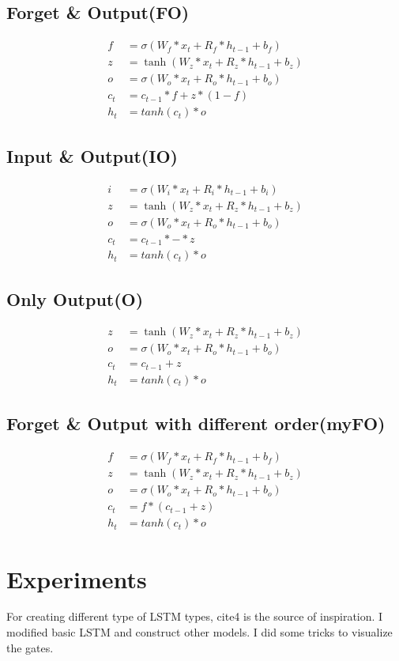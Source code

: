 \documentclass[12pt, letterpaper]{article}
\begin{document}
\subsection{Forget \& Output(FO)}
\begin{align*}
	f &= \sigma(W_f * x_{t} + R_f * h_{t-1} + b_f) \\
	z &= \tanh(W_z * x_{t} + R_z * h_{t-1} + b_z) \\ 
	o &= \sigma(W_o * x_{t} + R_o * h_{t-1} + b_o) \\
	c_t &= c_{t-1} * f + z * (1-f) \\
	h_t &= tanh(c_t) * o
\end{align*}
\subsection{Input \& Output(IO)}
\begin{align*}
	i &= \sigma(W_i * x_{t} + R_i * h_{t-1} + b_i) \\
	z &= \tanh(W_z * x_{t} + R_z * h_{t-1} + b_z) \\ 
	o &= \sigma(W_o * x_{t} + R_o * h_{t-1} + b_o) \\
	c_t &= c_{t-1}*- * z  \\
	h_t &= tanh(c_t) * o
\end{align*}
\subsection{Only Output(O)}
\begin{align*}
	z &= \tanh(W_z * x_{t} + R_z * h_{t-1} + b_z) \\ 
	o &= \sigma(W_o * x_{t} + R_o * h_{t-1} + b_o) \\
	c_t &= c_{t-1} + z  \\
	h_t &= tanh(c_t) * o
\end{align*}
\subsection{Forget \& Output with different order(myFO)}
\begin{align*}
	f &= \sigma(W_f * x_{t} + R_f * h_{t-1} + b_f) \\
	z &= \tanh(W_z * x_{t} + R_z * h_{t-1} + b_z) \\ 
	o &= \sigma(W_o * x_{t} + R_o * h_{t-1} + b_o) \\
	c_t &= f * (c_{t-1} + z)  \\
	h_t &= tanh(c_t) * o
\end{align*}
\section{Experiments}
	For creating different type of LSTM types, cite{4} is the source of inspiration. I modified basic LSTM and construct other models. I did some tricks to visualize the gates.
\end{document}
